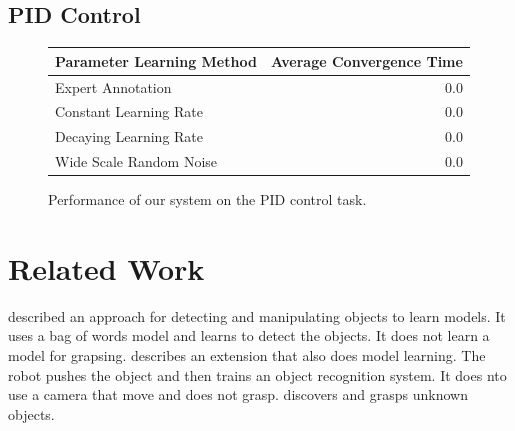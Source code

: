 \documentclass[conference]{IEEEtran}
\begin{document}
\subsection{PID Control}

\begin{figure}
  \begin{center}
  \begin{tabular}{lr}
    \toprule
  Parameter Learning Method & Average Convergence Time \\ 
  \midrule
  Expert Annotation & 0.0 \\ 
  Constant Learning Rate & 0.0 \\
  Decaying Learning Rate & 0.0 \\
  Wide Scale Random Noise & 0.0 \\
  \bottomrule
  \end{tabular}
  \caption{Performance of our system on the PID control task.}
  \end{center}
\end{figure}




\section{Related Work}

\citet{ude12} described an approach for detecting and manipulating
objects to learn models.  It uses a bag of words model and learns to
detect the objects.  It does not learn a model for grapsing.
\citet{schiebener13} describes an extension that also does model
learning.  The robot pushes the object and then trains an object
recognition system.  It does nto use a camera that move and does not
grasp.
\citet{schiebener12} discovers and grasps unknown objects.
\end{document}
